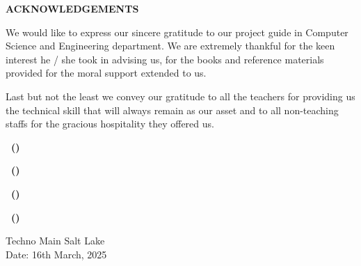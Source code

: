 
\thispagestyle{plain}

\begin{center}
    \LARGE {\bf \uppercase{Acknowledgements}}
   \end{center}
   
   \vspace{3\baselineskip}
   
   \noindent
   We would like to express our sincere gratitude to our project guide in Computer Science and Engineering department. We are extremely thankful for the keen interest he / she took in advising us, for the books and reference materials provided for the moral support extended to us.
   
   
   \vspace{\baselineskip}
   \noindent
   Last but not the least we convey our gratitude to all the teachers for providing us the technical skill that will always remain as our asset and to all non-teaching staffs for the gracious hospitality they offered us.

\vspace{\baselineskip}


\hspace{1.0\baselineskip}

\begin{flushright}

\vspace{2\baselineskip}
\textbf{\mynameone ~(\myrollnoone)}

\vspace{2\baselineskip}
\textbf{\mynametwo ~(\myrollnotwo)}

\vspace{2\baselineskip}
\textbf{\mynamethree ~(\myrollnothree)}

\vspace{2\baselineskip}
\textbf{\mynamefour ~(\myrollnofour)}

\end{flushright}

\vspace{2em}

\noindent
Techno Main Salt Lake \\
Date: 16th March, 2025

